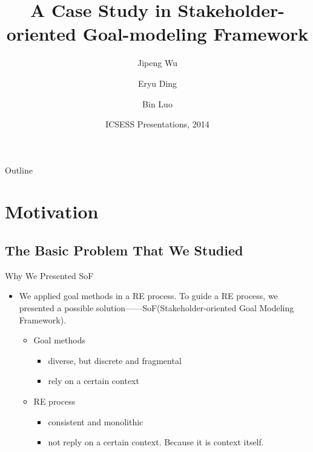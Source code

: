 \documentclass{beamer}
\title[A Case Study in SoF] {A Case Study in Stakeholder-oriented Goal-modeling Framework}
\subtitle{}
\author[Author]{Jipeng Wu \and Eryu Ding \and Bin Luo}
\institute[Universities of Somewhere and Elsewhere] {
                                 Software Institute\\
                                 Nanjing University
     }
\date[ICSESS 2014]
{ICSESS Presentations, 2014}
\begin{document}
\begin{frame}
  \titlepage
\end{frame}

\begin{frame}{Outline}
  \tableofcontents
\end{frame}

\section{Motivation}
\subsection{The Basic Problem That We Studied}
\begin{frame}{Why We Presented SoF}              %
  \begin{itemize}
  \item
    We applied goal methods in a RE process. To guide a RE process, we presented a possible solution——SoF(Stakeholder-oriented Goal Modeling Framework).
    \begin{itemize}
    \item Goal methods
      \begin{itemize}
      \item diverse, but discrete and fragmental  
      \item rely on a certain context 
      \end{itemize}
    \item RE process 
      \begin{itemize}
      \item consistent and monolithic 
      \item not reply on a certain context.   Because it is context itself.
      \end{itemize}
    \end{itemize}
  \end{itemize}
\end{frame}
\end{document}
